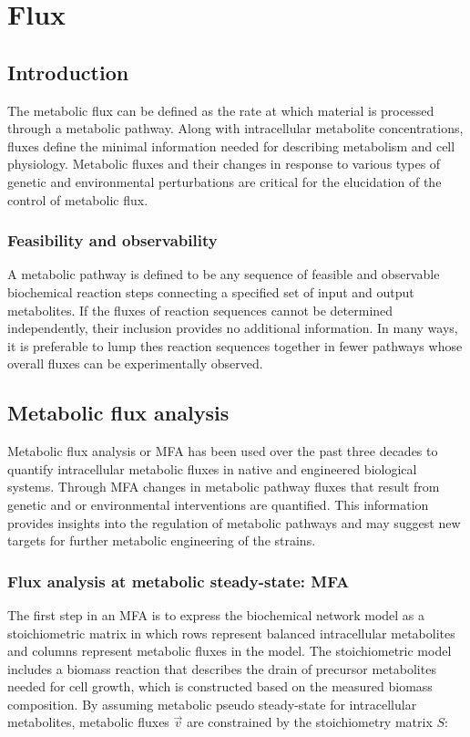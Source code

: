 \chapter{Flux}

\section{Introduction}
The metabolic flux can be defined as the rate at which material is processed through a metabolic pathway.
Along with intracellular metabolite concentrations, fluxes define the minimal information needed for describing metabolism and cell physiology.
Metabolic fluxes and their changes in response to various types of genetic and environmental perturbations are critical for the elucidation of the control of metabolic flux.

	\subsection{Feasibility and observability}
	A metabolic pathway is defined to be any sequence of feasible and observable biochemical reaction steps connecting a specified set of input and output metabolites.
	If the fluxes of reaction sequences cannot be determined independently, their inclusion provides no additional information.
	In many ways, it is preferable to lump thes reaction sequences together in fewer pathways whose overall fluxes can be experimentally observed.

\section{Metabolic flux analysis}
Metabolic flux analysis or MFA has been used over the past three decades to quantify intracellular metabolic fluxes in native and engineered biological systems.
Through MFA changes in metabolic pathway fluxes that result from genetic and or environmental interventions are quantified.
This information provides insights into the regulation of metabolic pathways and may suggest new targets for further metabolic engineering of the strains.

	\subsection{Flux analysis at metabolic steady-state: MFA}
	The first step in an MFA is to express the biochemical network model as a stoichiometric matrix in which rows represent balanced intracellular metabolites and columns represent metabolic fluxes in the model.
	The stoichiometric model includes a biomass reaction that describes the drain of precursor metabolites needed for cell growth, which is constructed based on the measured biomass composition.
	By assuming metabolic pseudo steady-state for intracellular metabolites, metabolic fluxes $\vec{v}$ are constrained by the stoichiometry matrix $S$:

